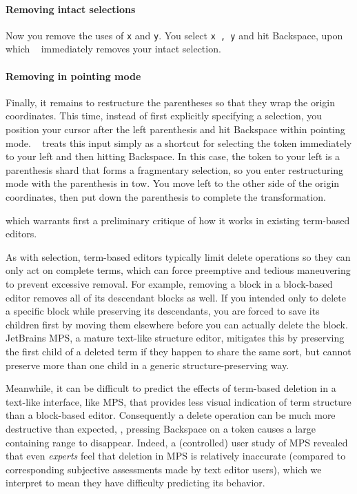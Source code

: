 \paragraph{Removing intact selections}
Now you remove the uses of \texttt{x} and \texttt{y}.
You select \texttt{x , y} and hit Backspace, upon
which \tylr~ immediately removes your intact selection.

\paragraph{Removing in pointing mode}
Finally, it remains to restructure the parentheses
so that they wrap the origin coordinates.
This time, instead of first explicitly specifying a selection,
you position your cursor after the left parenthesis
and hit Backspace within pointing mode.
\tylr~ treats this input simply as a shortcut for selecting the
token immediately to your left and then hitting Backspace.
In this case, the token to your left is a parenthesis
shard that forms a fragmentary selection, so you
enter restructuring mode with the parenthesis in tow.
You move left to the other side of the origin coordinates,
then put down the parenthesis to complete the transformation.

\vspace{0.5cm}



which warrants first a preliminary critique of how it
works in existing term-based editors.

As with selection, term-based editors typically
limit delete operations so they can only act on
complete terms, which can force preemptive and tedious
maneuvering to prevent excessive removal.
For example, removing a block in a block-based editor
removes all of its descendant blocks as well.
If you intended only to delete a specific block
while preserving its descendants, you are forced
to save its children first by moving them elsewhere
before you can actually delete the block.
JetBrains MPS, a mature text-like structure editor,
mitigates this by preserving the first child of a deleted term
if they happen to share the same sort,
but cannot preserve more than one child in a generic
structure-preserving way.

Meanwhile, it can be difficult to predict the
effects of term-based deletion in a text-like
interface, like MPS, that provides less visual
indication of term structure than a block-based editor.
Consequently a delete operation can be much
more destructive than expected, \eg,
pressing Backspace on a token
causes a large containing range to disappear.
Indeed, a (controlled) user study of MPS revealed
that even \emph{experts} feel that deletion in MPS
is relatively inaccurate (compared to corresponding
subjective assessments made by text editor users),
which we interpret to mean they have difficulty
predicting its behavior.


